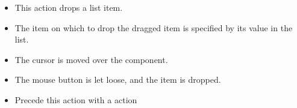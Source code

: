 
\begin{itemize}
\item This action drops a list item.
\item The item on which to drop the dragged item is specified by its value in the list.
\item The cursor is moved over the component.
\item The mouse button is let loose, and the item is dropped. 
\item Precede this action with a  action
\end{itemize}
